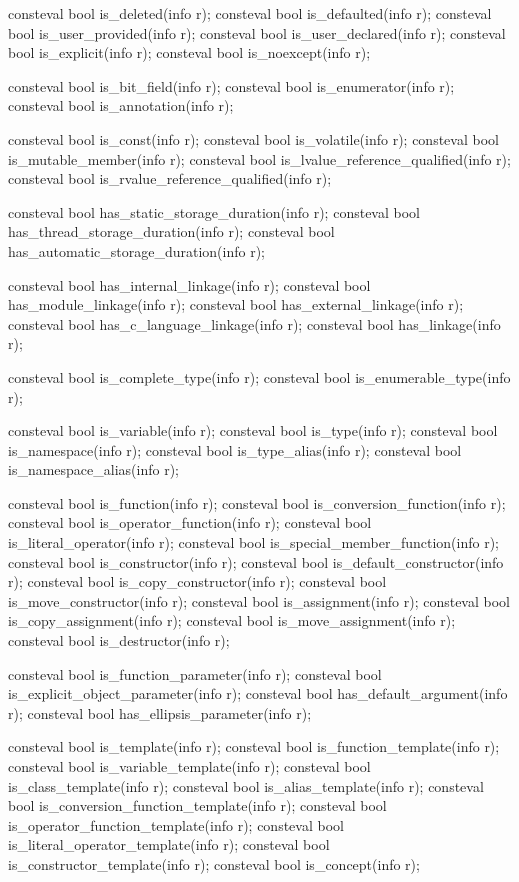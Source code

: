 \begin{codeblock}
{  consteval bool is_deleted(info r);
  consteval bool is_defaulted(info r);
  consteval bool is_user_provided(info r);
  consteval bool is_user_declared(info r);
  consteval bool is_explicit(info r);
  consteval bool is_noexcept(info r);

  consteval bool is_bit_field(info r);
  consteval bool is_enumerator(info r);
  consteval bool is_annotation(info r);

  consteval bool is_const(info r);
  consteval bool is_volatile(info r);
  consteval bool is_mutable_member(info r);
  consteval bool is_lvalue_reference_qualified(info r);
  consteval bool is_rvalue_reference_qualified(info r);

  consteval bool has_static_storage_duration(info r);
  consteval bool has_thread_storage_duration(info r);
  consteval bool has_automatic_storage_duration(info r);

  consteval bool has_internal_linkage(info r);
  consteval bool has_module_linkage(info r);
  consteval bool has_external_linkage(info r);
  consteval bool has_c_language_linkage(info r);
  consteval bool has_linkage(info r);

  consteval bool is_complete_type(info r);
  consteval bool is_enumerable_type(info r);

  consteval bool is_variable(info r);
  consteval bool is_type(info r);
  consteval bool is_namespace(info r);
  consteval bool is_type_alias(info r);
  consteval bool is_namespace_alias(info r);

  consteval bool is_function(info r);
  consteval bool is_conversion_function(info r);
  consteval bool is_operator_function(info r);
  consteval bool is_literal_operator(info r);
  consteval bool is_special_member_function(info r);
  consteval bool is_constructor(info r);
  consteval bool is_default_constructor(info r);
  consteval bool is_copy_constructor(info r);
  consteval bool is_move_constructor(info r);
  consteval bool is_assignment(info r);
  consteval bool is_copy_assignment(info r);
  consteval bool is_move_assignment(info r);
  consteval bool is_destructor(info r);

  consteval bool is_function_parameter(info r);
  consteval bool is_explicit_object_parameter(info r);
  consteval bool has_default_argument(info r);
  consteval bool has_ellipsis_parameter(info r);

  consteval bool is_template(info r);
  consteval bool is_function_template(info r);
  consteval bool is_variable_template(info r);
  consteval bool is_class_template(info r);
  consteval bool is_alias_template(info r);
  consteval bool is_conversion_function_template(info r);
  consteval bool is_operator_function_template(info r);
  consteval bool is_literal_operator_template(info r);
  consteval bool is_constructor_template(info r);
  consteval bool is_concept(info r);

}
\end{codeblock}
